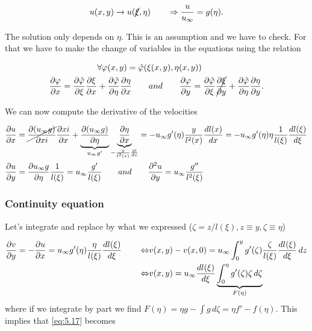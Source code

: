 		\begin{equation}
			u(x,y) \rightarrow u(\cancel{\xi} , \eta ) \qquad \Rightarrow \frac{u}{u_\infty} = g(\eta).
		\end{equation}
		
		The solution only depends on $\eta$. This is an assumption and we have to check. For that we have to make the change of variables in the equations using the relation 
		
		\begin{equation}
		\begin{aligned}
		&\forall \varphi (x,y) = \hat{\varphi}(\xi (x,y), \eta (x,y)) \\
			\frac{\partial \varphi}{\partial x} = \frac{\partial \hat{\varphi}}{\partial \xi} 	\frac{\partial \xi}{\partial x} &+ \frac{\partial \hat{\varphi}}{\partial \eta} \frac{\partial \eta}{\partial x} \qquad and \qquad
			\frac{\partial \varphi}{\partial y} = \frac{\partial \hat{\varphi}}{\partial \xi} \cancel{\frac{\partial \xi}{\partial y}} + \frac{\partial \hat{\varphi}}{\partial \eta} \frac{\partial \eta}{\partial y}.
		\end{aligned}
		\end{equation}
		
		We can now compute the derivative of the velocities
		
		\begin{equation}
		\begin{aligned}
			&\frac{\partial u}{\partial x} = \cancel{\frac{\partial (u_\infty g)}{\partial xi}} \frac{\partial xi}{\partial x} + \underbrace{\frac{\partial (u_\infty g)}{\partial \eta}}_{u_\infty g'} \underbrace{\frac{\partial \eta}{\partial x}}_{-\frac{y}{l^2(x)}\frac{dl}{dx}} = - u_\infty g'(\eta)\frac{y}{l^2(x)}\frac{dl(x)}{dx} = - u_\infty g'(\eta)\eta \frac{1}{l(\xi)} \frac{dl(\xi)}{d\xi}\\
			&\frac{\partial u}{\partial y} = \frac{\partial u_\infty g}{\partial \eta} \frac{1}{l(\xi)} = u_\infty \frac{g'}{l(\xi)} \qquad and \qquad \frac{\partial ^2 u}{\partial y }= u_\infty \frac{g''}{l^2(\xi)}
		\end{aligned}
		\label{eq:5.17}
		\end{equation}
		
		\subsubsection{Continuity equation}
			Let's integrate and replace by what we expressed ($\zeta = z/l(\xi), z \equiv y, \zeta \equiv \eta$)
	
			\begin{equation}
			\begin{aligned}
				\frac{\partial v}{\partial y} =- \frac{\partial u}{\partial x} = u_\infty g'(\eta) \frac{\eta}{l(\xi)} \frac{dl(\xi)}{d\xi} \qquad \Leftrightarrow &v(x,y) - v(x,0) = u_\infty \int _0 ^y g'(\zeta) \frac{\zeta}{l(\xi)} \frac{dl(\xi)}{d\xi} \, dz\\
				\Leftrightarrow &v(x,y) = u_\infty \frac{dl(\xi)}{d\xi} \underbrace{\int _0 ^\eta g'(\zeta) \zeta  \, d\zeta}_{F(\eta)}
			\end{aligned}	
			\end{equation}
			where if we integrate by part we find $F(\eta) = \eta g - \int g\, d\zeta = \eta f' - f(\eta)$. This implies that \eqref{eq:5.17} becomes 
			

